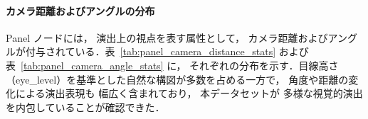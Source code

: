 \documentclass[a4j,12pt,dvipdfmx]{jsreport}
\begin{document}
\begin{table}[htbp]
\begin{minipage}[t]{0.48\linewidth}
      \vspace{1em}
   \end{minipage}
\end{table}


\paragraph{カメラ距離およびアングルの分布}
Panel ノードには，
演出上の視点を表す属性として，
カメラ距離およびアングルが付与されている．表~\ref{tab:panel_camera_distance_stats} および
表~\ref{tab:panel_camera_angle_stats} に，
それぞれの分布を示す．目線高さ（eye\_level）を基準とした自然な構図が多数を占める一方で，
角度や距離の変化による演出表現も
幅広く含まれており，
本データセットが
多様な視覚的演出を内包していることが確認できた．
\end{document}
